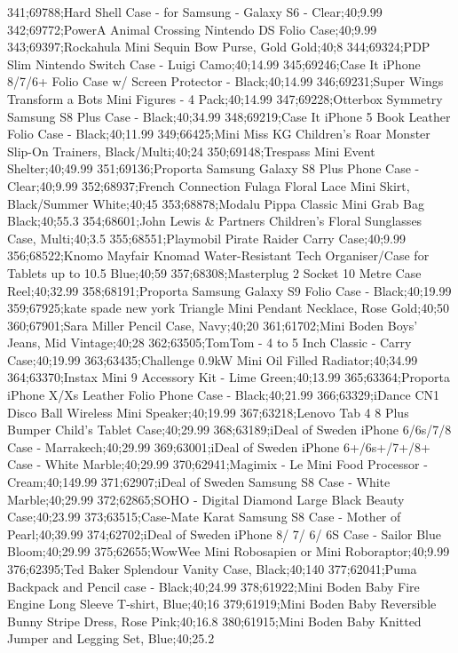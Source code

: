 341;69788;Hard Shell Case - for Samsung - Galaxy S6 - Clear;40;9.99
342;69772;PowerA Animal Crossing Nintendo DS Folio Case;40;9.99
343;69397;Rockahula Mini Sequin Bow Purse, Gold Gold;40;8
344;69324;PDP Slim Nintendo Switch Case - Luigi Camo;40;14.99
345;69246;Case It iPhone 8/7/6+ Folio Case w/ Screen Protector - Black;40;14.99
346;69231;Super Wings Transform a Bots Mini Figures - 4 Pack;40;14.99
347;69228;Otterbox Symmetry Samsung S8 Plus Case - Black;40;34.99
348;69219;Case It iPhone 5 Book Leather Folio Case - Black;40;11.99
349;66425;Mini Miss KG Children's Roar Monster Slip-On Trainers, Black/Multi;40;24
350;69148;Trespass Mini Event Shelter;40;49.99
351;69136;Proporta Samsung Galaxy S8 Plus Phone Case - Clear;40;9.99
352;68937;French Connection Fulaga Floral Lace Mini Skirt, Black/Summer White;40;45
353;68878;Modalu Pippa Classic Mini Grab Bag Black;40;55.3
354;68601;John Lewis & Partners Children's Floral Sunglasses Case, Multi;40;3.5
355;68551;Playmobil Pirate Raider Carry Case;40;9.99
356;68522;Knomo Mayfair Knomad Water-Resistant Tech Organiser/Case for Tablets up to 10.5 Blue;40;59
357;68308;Masterplug 2 Socket 10 Metre Case Reel;40;32.99
358;68191;Proporta Samsung Galaxy S9 Folio Case - Black;40;19.99
359;67925;kate spade new york Triangle Mini Pendant Necklace, Rose Gold;40;50
360;67901;Sara Miller Pencil Case, Navy;40;20
361;61702;Mini Boden Boys' Jeans, Mid Vintage;40;28
362;63505;TomTom - 4 to 5 Inch Classic - Carry Case;40;19.99
363;63435;Challenge 0.9kW Mini Oil Filled Radiator;40;34.99
364;63370;Instax Mini 9 Accessory Kit - Lime Green;40;13.99
365;63364;Proporta iPhone X/Xs Leather Folio Phone Case - Black;40;21.99
366;63329;iDance CN1 Disco Ball Wireless Mini Speaker;40;19.99
367;63218;Lenovo Tab 4 8 Plus Bumper Child's Tablet Case;40;29.99
368;63189;iDeal of Sweden iPhone 6/6s/7/8 Case - Marrakech;40;29.99
369;63001;iDeal of Sweden iPhone 6+/6s+/7+/8+ Case - White Marble;40;29.99
370;62941;Magimix - Le Mini Food Processor - Cream;40;149.99
371;62907;iDeal of Sweden Samsung S8 Case - White Marble;40;29.99
372;62865;SOHO - Digital Diamond Large Black Beauty Case;40;23.99
373;63515;Case-Mate Karat Samsung S8 Case - Mother of Pearl;40;39.99
374;62702;iDeal of Sweden iPhone 8/ 7/ 6/ 6S Case - Sailor Blue Bloom;40;29.99
375;62655;WowWee Mini Robosapien or Mini Roboraptor;40;9.99
376;62395;Ted Baker Splendour Vanity Case, Black;40;140
377;62041;Puma Backpack and Pencil case - Black;40;24.99
378;61922;Mini Boden Baby Fire Engine Long Sleeve T-shirt, Blue;40;16
379;61919;Mini Boden Baby Reversible Bunny Stripe Dress, Rose Pink;40;16.8
380;61915;Mini Boden Baby Knitted Jumper and Legging Set, Blue;40;25.2
